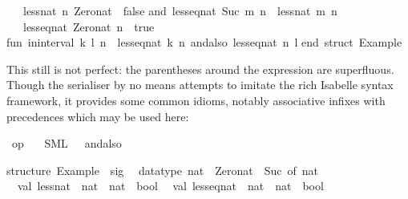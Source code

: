 \begin{isabellebody}
\begin{isamarkuptext}
\ \ {\isacharbar}\ less{\isacharunderscore}nat\ n\ Zero{\isacharunderscore}nat\ {\isacharequal}\ false\isanewline
and\ less{\isacharunderscore}eq{\isacharunderscore}nat\ {\isacharparenleft}Suc\ m{\isacharparenright}\ n\ {\isacharequal}\ less{\isacharunderscore}nat\ m\ n\isanewline
\ \ {\isacharbar}\ less{\isacharunderscore}eq{\isacharunderscore}nat\ Zero{\isacharunderscore}nat\ n\ {\isacharequal}\ true{\isacharsemicolon}\isanewline
\isanewline
fun\ in{\isacharunderscore}interval\ {\isacharparenleft}k{\isacharcomma}\ l{\isacharparenright}\ n\ {\isacharequal}\ {\isacharparenleft}less{\isacharunderscore}eq{\isacharunderscore}nat\ k\ n{\isacharparenright}\ andalso\ {\isacharparenleft}less{\isacharunderscore}eq{\isacharunderscore}nat\ n\ l{\isacharparenright}{\isacharsemicolon}\isanewline
\isanewline
end{\isacharsemicolon}\ {\isacharparenleft}{\isacharasterisk}struct\ Example{\isacharasterisk}{\isacharparenright}\isanewline%
\end{isamarkuptext}%
\isamarkuptrue%
%
\endisatagquotetypewriter
{\isafoldquotetypewriter}%
%
\isadelimquotetypewriter
%
\endisadelimquotetypewriter
%
\begin{isamarkuptext}%
\noindent This still is not perfect: the parentheses around the
   expression are superfluous.  Though the serialiser by
  no means attempts to imitate the rich Isabelle syntax framework, it
  provides some common idioms, notably associative infixes with
  precedences which may be used here:%
\end{isamarkuptext}%
\isamarkuptrue%
%
\isadelimquotett
%
\endisadelimquotett
%
\isatagquotett
{}\isamarkupfalse%
\ {\isachardoublequoteopen}op\ {\isasymand}{\isachardoublequoteclose}\isanewline
\ \ {\isacharparenleft}SML\ \ {}\ {\isachardoublequoteopen}andalso{\isachardoublequoteclose}{\isacharparenright}%
\endisatagquotett
{\isafoldquotett}%
%
\isadelimquotett
%
\endisadelimquotett
%
\isadelimquotetypewriter
%
\endisadelimquotetypewriter
%
\isatagquotetypewriter
%
\begin{isamarkuptext}%
structure\ Example\ {\isacharcolon}\ sig\isanewline
\ \ datatype\ nat\ {\isacharequal}\ Zero{\isacharunderscore}nat\ {\isacharbar}\ Suc\ of\ nat\isanewline
\ \ val\ less{\isacharunderscore}nat\ {\isacharcolon}\ nat\ {\isacharminus}{\isachargreater}\ nat\ {\isacharminus}{\isachargreater}\ bool\isanewline
\ \ val\ less{\isacharunderscore}eq{\isacharunderscore}nat\ {\isacharcolon}\ nat\ {\isacharminus}{\isachargreater}\ nat\ {\isacharminus}{\isachargreater}\ bool\isanewline

\end{isamarkuptext}
\end{isabellebody}
